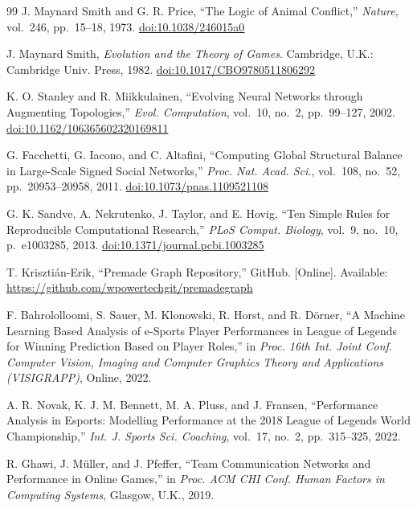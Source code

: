 \begin{thebibliography}{99}
J. Maynard Smith and G. R. Price, ``The Logic of Animal Conflict,''
\textit{Nature}, vol.~246, pp.~15--18, 1973.
\href{https://doi.org/10.1038/246015a0}{doi:10.1038/246015a0}

J. Maynard Smith, \textit{Evolution and the Theory of Games}.
Cambridge, U.K.: Cambridge Univ. Press, 1982.
\href{https://doi.org/10.1017/CBO9780511806292}{doi:10.1017/CBO9780511806292}

K. O. Stanley and R. Miikkulainen,
``Evolving Neural Networks through Augmenting Topologies,''
\textit{Evol. Computation}, vol.~10, no.~2, pp.~99--127, 2002.
\href{https://doi.org/10.1162/106365602320169811}{doi:10.1162/106365602320169811}

G. Facchetti, G. Iacono, and C. Altafini,
``Computing Global Structural Balance in Large-Scale Signed Social Networks,''
\textit{Proc. Nat. Acad. Sci.}, vol.~108, no.~52, pp.~20953--20958, 2011.
\href{https://doi.org/10.1073/pnas.1109521108}{doi:10.1073/pnas.1109521108}

G. K. Sandve, A. Nekrutenko, J. Taylor, and E. Hovig,
``Ten Simple Rules for Reproducible Computational Research,''
\textit{PLoS Comput. Biology}, vol.~9, no.~10, p.~e1003285, 2013.
\href{https://doi.org/10.1371/journal.pcbi.1003285}{doi:10.1371/journal.pcbi.1003285}

T. Krisztián-Erik, ``Premade Graph Repository,'' GitHub. [Online]. Available:
\url{https://github.com/wpowertechgit/premadegraph}

F. Bahrololloomi, S. Sauer, M. Klonowski, R. Horst, and R. Dörner,
``A Machine Learning Based Analysis of e-Sports Player Performances in League of Legends
for Winning Prediction Based on Player Roles,''
in \textit{Proc. 16th Int. Joint Conf. Computer Vision, Imaging and Computer Graphics
Theory and Applications (VISIGRAPP)}, Online, 2022.

A. R. Novak, K. J. M. Bennett, M. A. Pluss, and J. Fransen,
``Performance Analysis in Esports: Modelling Performance at the 2018 League of Legends
World Championship,''
\textit{Int. J. Sports Sci. Coaching}, vol.~17, no.~2, pp.~315--325, 2022.

R. Ghawi, J. Müller, and J. Pfeffer,
``Team Communication Networks and Performance in Online Games,''
in \textit{Proc. ACM CHI Conf. Human Factors in Computing Systems},
Glasgow, U.K., 2019.


\end{thebibliography}
